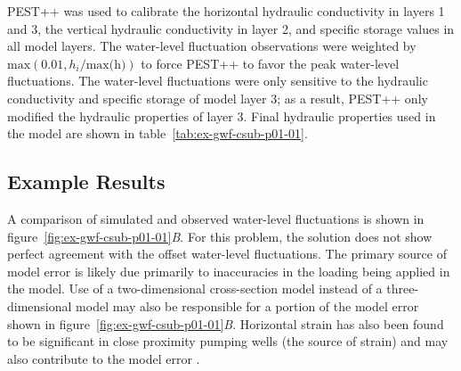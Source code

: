 PEST++ \citep{welter2015approaches} was used to calibrate the horizontal hydraulic conductivity in layers 1 and 3, the vertical hydraulic conductivity in layer 2, and specific storage values in all model layers. The water-level fluctuation observations were weighted by $\text{max} ( 0.01, h_i / \text{max(h)} )$ to force PEST++ to favor the peak water-level fluctuations. The water-level fluctuations were only sensitive to the hydraulic conductivity and specific storage of model layer 3; as a result, PEST++ only modified the hydraulic properties of layer 3. Final hydraulic properties used in the model are shown in table~\ref{tab:ex-gwf-csub-p01-01}. 

\subsection{Example Results}

A comparison of simulated and observed water-level fluctuations is shown in figure~\ref{fig:ex-gwf-csub-p01-01}\textit{B}. For this problem, the \mf solution does not show perfect agreement with the offset water-level fluctuations. The primary source of model error is likely due primarily to inaccuracies in the loading being applied in the model. Use of a two-dimensional cross-section model instead of a three-dimensional model may also be responsible for a portion of the model error shown in figure~\ref{fig:ex-gwf-csub-p01-01}\textit{B}. Horizontal strain has also been found to be significant in close proximity pumping wells (the source of strain) and may also contribute to the model error \citep{burbey2001storage}.
